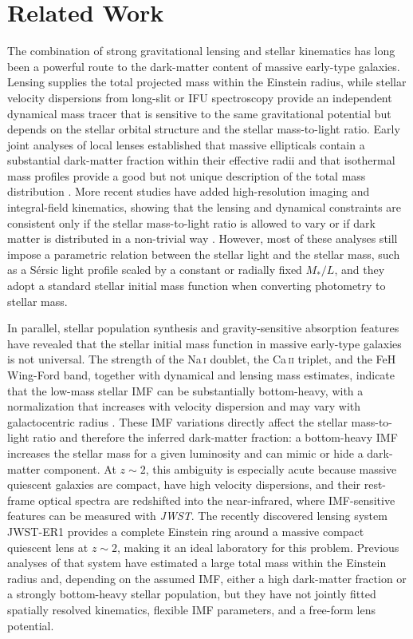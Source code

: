 \documentclass{article}
\begin{document}
\section{Related Work}

The combination of strong gravitational lensing and stellar kinematics has long been a powerful route to the dark-matter content of massive early-type galaxies. Lensing supplies the total projected mass within the Einstein radius, while stellar velocity dispersions from long-slit or IFU spectroscopy provide an independent dynamical mass tracer that is sensitive to the same gravitational potential but depends on the stellar orbital structure and the stellar mass-to-light ratio. Early joint analyses of local lenses established that massive ellipticals contain a substantial dark-matter fraction within their effective radii and that isothermal mass profiles provide a good but not unique description of the total mass distribution \cite{treu2004,koopmans2004,auger2010,barnabe2011,sonnenfeld2013}. More recent studies have added high-resolution imaging and integral-field kinematics, showing that the lensing and dynamical constraints are consistent only if the stellar mass-to-light ratio is allowed to vary or if dark matter is distributed in a non-trivial way \cite{shajib2021}. However, most of these analyses still impose a parametric relation between the stellar light and the stellar mass, such as a S\'ersic light profile scaled by a constant or radially fixed $M_\ast/L$, and they adopt a standard stellar initial mass function when converting photometry to stellar mass.

In parallel, stellar population synthesis and gravity-sensitive absorption features have revealed that the stellar initial mass function in massive early-type galaxies is not universal. The strength of the Na\,\textsc{i} doublet, the Ca\,\textsc{ii} triplet, and the FeH Wing-Ford band, together with dynamical and lensing mass estimates, indicate that the low-mass stellar IMF can be substantially bottom-heavy, with a normalization that increases with velocity dispersion and may vary with galactocentric radius \cite{conroy2012,cappellari2012,labarbera2013,spiniello2014,smith2015}. These IMF variations directly affect the stellar mass-to-light ratio and therefore the inferred dark-matter fraction: a bottom-heavy IMF increases the stellar mass for a given luminosity and can mimic or hide a dark-matter component. At $z\sim2$, this ambiguity is especially acute because massive quiescent galaxies are compact, have high velocity dispersions, and their rest-frame optical spectra are redshifted into the near-infrared, where IMF-sensitive features can be measured with \emph{JWST}. The recently discovered lensing system JWST-ER1 \cite{vandokkum2024} provides a complete Einstein ring around a massive compact quiescent lens at $z\sim2$, making it an ideal laboratory for this problem. Previous analyses of that system have estimated a large total mass within the Einstein radius and, depending on the assumed IMF, either a high dark-matter fraction or a strongly bottom-heavy stellar population, but they have not jointly fitted spatially resolved kinematics, flexible IMF parameters, and a free-form lens potential.
\end{document}
